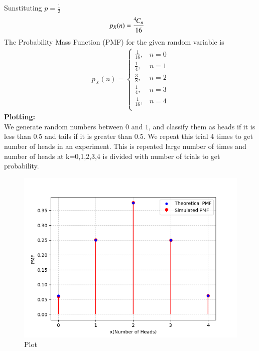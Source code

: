 \documentclass[journal]{IEEEtran}
\begin{document}
Sunstituting $p=\frac{1}{2}$
\begin{align}
	p_{X}(n) &= \frac{{{}^{4}\mkern-1muC_{n}}}{16}
    \end{align}
    The Probability Mass Function (PMF) for the given random variable is
\begin{align}
p_X(n) =
\begin{cases}
	\frac{1}{16}, & n = 0 \\
	\frac{1}{4}, & n = 1 \\
	\frac{3}{8}, & n = 2 \\
	\frac{1}{4}, & n = 3 \\
        \frac{1}{16}, & n=4\\
\end{cases}
\end{align}
\textbf{Plotting:}\\
We generate random numbers between $0$ and $1$, and classify them as heads if it is less than 0.5 and tails if it is greater than 0.5. We repeat this trial 4 times to get number of heads in an experiment. This is repeated large number of times and number of heads at k=0,1,2,3,4 is divided with number of trials to get probability.
\begin{figure}[h!]
   \centering
   \includegraphics[width=1\columnwidth]{Figs/Figure_1.png}
   \caption{Plot}
\end{figure}
\end{document}
